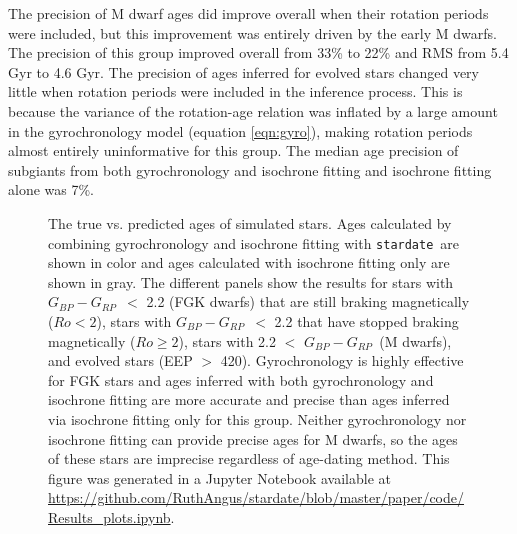 \documentclass[useAMS, usenatbib, preprint, 12pt]{aastex}
\newcommand{\sd}{{\tt stardate}}
\newcommand{\gcolor}{$G_{BP} - G_{RP}$}
\begin{document}
The precision of M dwarf ages did improve overall when their rotation periods
were included, but this improvement was entirely driven by the early M dwarfs.
The precision of this group improved overall from 33\% to 22\% and RMS from
5.4 Gyr to 4.6 Gyr.
The precision of ages inferred for evolved stars changed very little when
rotation periods were included in the inference process.
This is because the variance of the rotation-age relation was inflated by a
large amount in the gyrochronology model (equation \ref{eqn:gyro}), making
rotation periods almost entirely uninformative for this group.
The median age precision of subgiants from both gyrochronology and isochrone
fitting and isochrone fitting alone was 7\%.

\begin{figure}
  \caption{
The true vs. predicted ages of simulated stars.
    Ages calculated by combining gyrochronology
    and isochrone fitting with \sd\ are shown in color and ages calculated with
    isochrone fitting only are shown in gray.
The different panels show the results for stars
    with \gcolor\ $<$ 2.2 (FGK dwarfs) that are still braking magnetically
    ($Ro < 2$), stars with \gcolor\ $<$ 2.2 that have stopped braking
    magnetically ($Ro \geq 2$),
    stars with 2.2 $<$ \gcolor\ (M dwarfs), and evolved stars (EEP $>$ 420).
Gyrochronology is highly effective for FGK stars and ages inferred with both
    gyrochronology and isochrone fitting are more accurate and precise than
    ages inferred via isochrone fitting only for this group.
Neither gyrochronology nor isochrone fitting can provide precise ages for
    M dwarfs, so the ages of these stars are imprecise regardless of
    age-dating method.
    This figure was generated in a Jupyter Notebook available at
    \url{https://github.com/RuthAngus/stardate/blob/master/paper/code/Results_plots.ipynb}.
}
  \centering

\end{figure}
\end{document}
